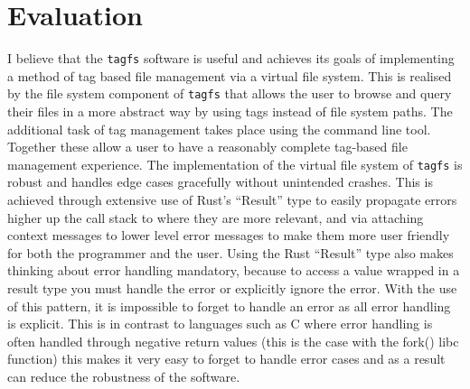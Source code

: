 \chapter{Evaluation}
\vspace{1cm}

I believe that the \texttt{tagfs} software is useful and achieves its goals of
implementing a method of tag based file management via a virtual file system.
This is realised by the file system component of \texttt{tagfs} that allows the
user to browse and query their files in a more abstract way by using tags
instead of file system paths. The additional task of tag management takes place
using the command line tool. Together these allow a user to have a reasonably
complete tag-based file management experience. The implementation of the
virtual file system of \texttt{tagfs} is robust and handles edge cases
gracefully without unintended crashes. This is achieved through extensive use
of Rust's ``Result'' type to easily propagate errors higher up the call stack
to where they are more relevant, and via attaching context messages to lower
level error messages to make them more user friendly for both the programmer
and the user. Using the Rust ``Result'' type also makes thinking about error
handling mandatory, because to access a value wrapped in a result type you must
handle the error or explicitly ignore the error. With the use of this pattern,
it is impossible to forget to handle an error as all error handling is
explicit. This is in contrast to languages such as C where error handling is
often handled through negative return values (this is the case with the fork()
libc function) this makes it very easy to forget to handle error cases and as a
result can reduce the robustness of the software.

